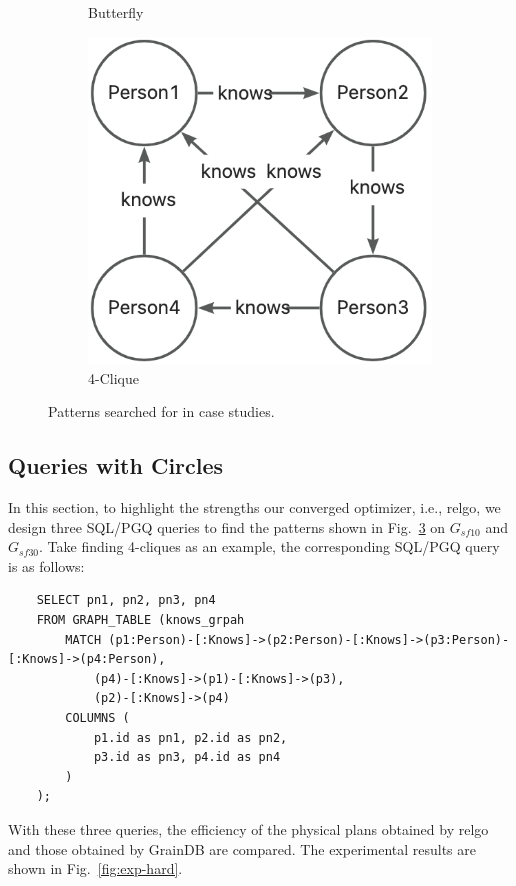 \begin{figure}[ht]
\begin{subfigure}[b]{.3\linewidth}
        \caption{Butterfly}
        \label{fig:exp-hard-butterfly}
    \end{subfigure}
    \begin{subfigure}[b]{0.3\linewidth}
        \centering
        \includegraphics[width=\linewidth]{./figures/exp/pattern-clique.png}
        \caption{4-Clique}
        \label{fig:exp-hard-clique}
    \end{subfigure}
    \caption{Patterns searched for in case studies.}
    \label{fig:exp-hard-patterns}
\end{figure}

\subsection{Queries with Circles}
\label{sec:experiment-circle}

In this section, to highlight the strengths our converged optimizer, i.e., relgo, we design three SQL/PGQ queries to find the patterns shown in Fig.~\ref{fig:exp-hard-patterns} on $G_{sf10}$ and $G_{sf30}$.
Take finding 4-cliques as an example, the corresponding SQL/PGQ query is as follows:
\begin{lstlisting}
    SELECT pn1, pn2, pn3, pn4 
    FROM GRAPH_TABLE (knows_grpah
        MATCH (p1:Person)-[:Knows]->(p2:Person)-[:Knows]->(p3:Person)-[:Knows]->(p4:Person),
            (p4)-[:Knows]->(p1)-[:Knows]->(p3),
            (p2)-[:Knows]->(p4)
        COLUMNS (
            p1.id as pn1, p2.id as pn2, 
            p3.id as pn3, p4.id as pn4
        )
    );
\end{lstlisting}
With these three queries, the efficiency of the physical plans obtained by relgo and those obtained by GrainDB are compared.
The experimental results are shown in Fig.~\ref{fig:exp-hard}.


